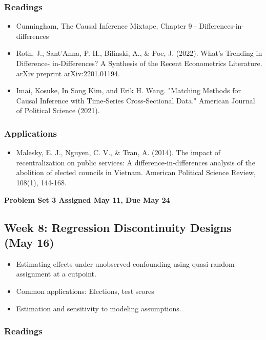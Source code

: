 \documentclass[11pt, article, oneside]{memoir}
\theoremstyle{Assumption}
\begin{document}
\subsubsection*{Readings}

\begin{itemize}
\item Cunningham, The Causal Inference Mixtape, Chapter 9 - Differences-in-differences
\item Roth, J., Sant'Anna, P. H., Bilinski, A., \& Poe, J. (2022). What's Trending in Difference- in-Differences? A Synthesis of the Recent Econometrics Literature. arXiv preprint arXiv:2201.01194.
\item Imai, Kosuke, In Song Kim, and Erik H. Wang. "Matching Methods for Causal Inference with Time‐Series Cross‐Sectional Data." American Journal of Political Science (2021).
\end{itemize}

\subsubsection*{Applications}

\begin{itemize}
\item Malesky, E. J., Nguyen, C. V., \& Tran, A. (2014). The impact of recentralization on public services: A difference-in-differences analysis of the abolition of elected councils in Vietnam. American Political Science Review, 108(1), 144-168.
\end{itemize}

\textbf{Problem Set 3 Assigned May 11, Due May 24}

\subsection{Week 8: Regression Discontinuity Designs (May 16)}

\begin{itemize}
\item Estimating effects under unobserved confounding using quasi-random assignment at a cutpoint.
\item Common applications: Elections, test scores
\item Estimation and sensitivity to modeling assumptions.
\end{itemize}

\subsubsection*{Readings}
\end{document}
